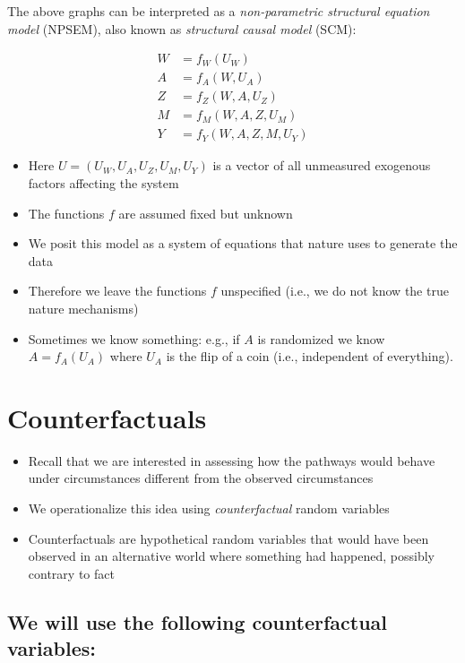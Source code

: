 \documentclass[
  12pt,
]{book}
\providecommand{\tightlist}{%
  \setlength{\itemsep}{0pt}\setlength{\parskip}{0pt}}
\theoremstyle{definition}
\theoremstyle{definition}
\theoremstyle{definition}
\newcommand{\1}{\mathbbm{1}}
\begin{document}
The above graphs can be interpreted as a \emph{non-parametric structural equation
model} (NPSEM), also known as \emph{structural causal model} (SCM):

\begin{align}
  W & = f_W(U_W)\\
  A & = f_A(W, U_A)\\
  Z & = f_Z(W, A, U_Z)\\
  M & = f_M(W, A, Z, U_M)\\
  Y & = f_Y(W, A, Z, M, U_Y)
\end{align}

\begin{itemize}
\tightlist
\item
  Here \(U=(U_W, U_A, U_Z, U_M, U_Y)\) is a vector of all unmeasured exogenous
  factors affecting the system
\item
  The functions \(f\) are assumed fixed but unknown
\item
  We posit this model as a system of equations that nature uses to generate the
  data
\item
  Therefore we leave the functions \(f\) unspecified (i.e., we do not know the
  true nature mechanisms)
\item
  Sometimes we know something: e.g., if \(A\) is randomized we know \(A=f_A(U_A)\)
  where \(U_A\) is the flip of a coin (i.e., independent of everything).
\end{itemize}

\hypertarget{counterfactuals}{%
\section{Counterfactuals}\label{counterfactuals}}

\begin{itemize}
\tightlist
\item
  Recall that we are interested in assessing how the pathways would behave under
  circumstances different from the observed circumstances
\item
  We operationalize this idea using \emph{counterfactual} random variables
\item
  Counterfactuals are hypothetical random variables that would have been
  observed in an alternative world where something had happened, possibly
  contrary to fact
\end{itemize}

\hypertarget{we-will-use-the-following-counterfactual-variables}{%
\subsection*{We will use the following counterfactual variables:}\label{we-will-use-the-following-counterfactual-variables}}
\end{document}
